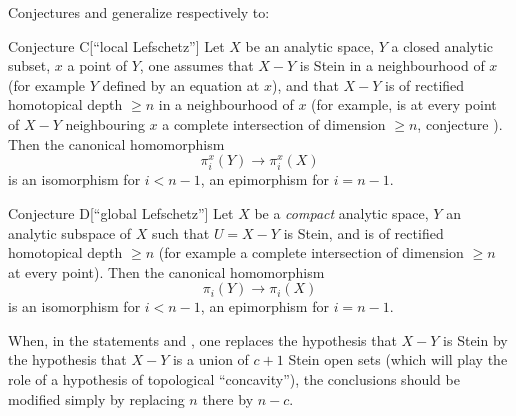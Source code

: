 Conjectures  and  generalize respectively to:

 \label{XIII.6.C}
\begin{enonce*}{Conjecture C}[``local Lefschetz''\ndemark]
Let $X$ be an analytic space, $Y$ a closed analytic subset, $x$ a point of $Y$, one assumes that $X-Y$ is Stein in a neighbourhood of $x$ (for example $Y$ defined by an equation at $x$), and that $X-Y$ is of rectified homotopical depth $\geq n$ in a neighbourhood of $x$ (for example, is at every point of $X-Y$ neighbouring $x$ a complete intersection of dimension $\geq n$, \cf conjecture ). Then the canonical homomorphism
$$
\pi_i^x(Y)\to\pi_i^x(X)$$
is an isomorphism for $i<n-1$, an epimorphism for $i=n-1$.
\end{enonce*}

 \label{XIII.6.D}
\begin{enonce*}{Conjecture D}[``global Lefschetz''\ndemark]
Let $X$ be a \emph{compact} analytic space, $Y$ an analytic subspace of $X$ such that $U=X-Y$ is Stein, and is of rectified homotopical depth $\geq n$ (for example a complete intersection of dimension $\geq n$ at every point). Then the canonical homomorphism
$$
\pi_i(Y)\to\pi_i(X)$$
is an isomorphism for $i<n-1$, an epimorphism for $i=n-1$.
\end{enonce*}

\begin{remarkstar}
When, in the statements  and , one
replaces the hypothesis that $X-Y$ is Stein by the hypothesis that
$X-Y$ is a union of $c+1$ Stein open sets (which will play the
role of a hypothesis of topological ``concavity''), the
conclusions should be modified simply by replacing
$n$ there by $n-c$.
\end{remarkstar}

